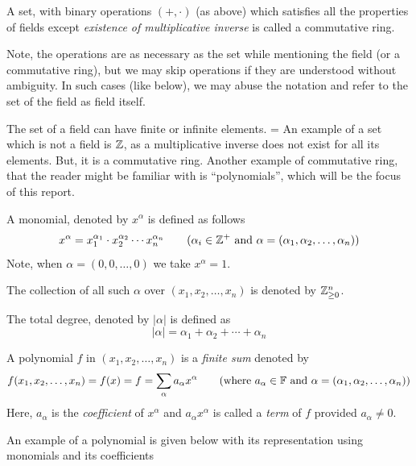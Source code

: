 \documentclass[a4paper,11pt]{article}
\begin{document}
\begin{defn}
    A set, with binary operations $(+,\cdot)$ (as above) which satisfies all the properties of fields except \emph{existence of multiplicative inverse} is called a commutative ring.
\end{defn}
Note, the operations are as necessary as the set while mentioning the field (or a commutative ring), but we may skip operations if they are understood without ambiguity. In such cases (like below), we may abuse the notation and refer to the set of the field as field itself.

The set of a field can have finite or infinite elements.
=
An example of a set which is not a field is $\mathbb{Z}$, as a multiplicative inverse does not exist for all its elements. But, it is a commutative ring. Another example of commutative ring, that the reader might be familiar with is ``polynomials'', which will be the focus of this report. 
\begin{defn}[Monomial]
    A monomial, denoted by $x^\alpha$ is defined as follows
    \begin{equation}
        x^\alpha= x_1^{\alpha_1}\cdot x_2^{\alpha_2}\cdots x_n^{\alpha_n} \qquad(\alpha_i \in \mathbb{Z}^+ \text{ and } \alpha = (\alpha_1, \alpha_2, \ldots, \alpha_n))
    \end{equation}
Note, when $\alpha = (0,0,\ldots,0)$ we take $x^\alpha=1$.
\end{defn}
The collection of all such $\alpha$ over $(x_1, x_2, \ldots, x_n)$ is denoted by $\mathbb{Z}^n_{\geq0}$.
\begin{defn}
    The total degree, denoted by $|\alpha|$ is defined as
    \begin{equation}
        |\alpha| = \alpha_1 + \alpha_2 + \cdots + \alpha_n
    \end{equation}
\end{defn}
\begin{defn}[Polynomial]
    A polynomial $f$ in $(x_1, x_2, \ldots, x_n)$ is a \emph{finite sum} denoted by
    \begin{equation}
        f(x_1, x_2, \ldots, x_n) = f(x) = f = \sum_\alpha a_\alpha x^\alpha \qquad(\text{where } a_\alpha \in \mathbb{F} \text{ and } \alpha = (\alpha_1, \alpha_2, \ldots, \alpha_n))
    \end{equation}
Here, $a_\alpha$ is the \emph{coefficient} of $x^\alpha$ and $a_\alpha x^\alpha$ is called a \emph{term} of $f$ provided $a_\alpha \neq 0$.
\end{defn}
An example of a polynomial is given below with its representation using monomials and its coefficients 
\end{document}
